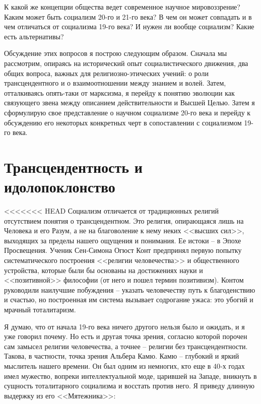 \documentclass{book}
\begin{document}
К какой же концепции общества ведет современное научное мировоззрение? Каким может быть социализм 20-го и 21-го века? В чем он может совпадать и в чем отличаться от социализ­ма 19-го века? И нужен ли вообще социализм? Какие есть аль­тернативы?

Обсуждение этих вопросов я построю следующим образом. Сначала мы рассмотрим, опираясь на исторический опыт социалистического движения, два общих вопроса, важных для религиозно-этических учений: о роли трансцендентного и о взаимоотношении между знанием и волей. Затем, отталкиваясь опять-таки от марксизма, я перейду к понятию эволюции как связующего звена между описанием действительности и Высшей Целью. Затем я сформулирую свое представление о научном социализме 20-го века и перейду к обсуждению его некоторых конкретных черт в сопоставлении с социализмом 19-го века.



\section{Трансцендентность и идолопоклонство}

<<<<<<< HEAD
Социализм отличается от традиционных религий отсутствием понятия о трансцендентном. Это религия, опирающаяся лишь на Человека и его Разум, а не на благоволение к нему неких <<высших сил>>, выходящих за пределы нашего ощущения и понимания. Ее истоки -- в Эпохе Просвещения. Ученик Сен‑Симона Огюст Конт предпринял первую попытку системати­ческого построения <<религии человечества>> и общественного устройства, которые были бы основаны на достижениях науки и <<позитивной>> философии (от него и пошел термин позитивизм).  Контом руководили наилучшие побуждения -- указать человечеству путь к благоденствию и счастью, но построенная им система вызывает содрогание ужаса: это убогий и мрачный тоталитаризм.

Я думаю, что от начала 19‑го века ничего другого нельзя было и ожидать, и я уже говорил почему. Но есть и другая точка зрения, согласно которой порочен сам замысел религии человечества, а точнее -- религии без трансцендентности. Такова, в частности, точка зрения Альбера Камю. Камю -- глубокий и яркий мыслитель нашего времени. Он был одним из немногих, кто еще в 40‑х годах имел мужество, вопреки интеллектуальной моде, царившей на Западе, вникнуть в сущность тоталитарного социализма и восстать против него. Я приведу длинную выдержку из его <<Мятежника>>:
\end{document}
